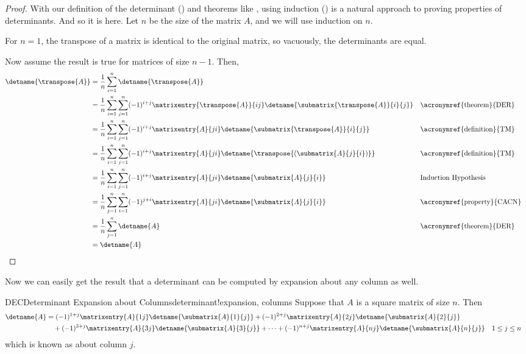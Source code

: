 \begin{proof}
%
With our definition of the determinant () and theorems like , using induction () is a natural approach to proving properties of determinants.  And so it is here.  Let $n$ be the size of the matrix $A$, and we will use induction on $n$.\par
%
For $n=1$, the transpose of a matrix is identical to the original matrix, so vacuously, the determinants are equal.\par
%
Now assume the result is true for matrices of size $n-1$.  Then,
%
\begin{align*}
\detname{\transpose{A}}
&=\frac{1}{n}\sum_{i=1}^{n}\detname{\transpose{A}}\\
%
&=
\frac{1}{n}\sum_{i=1}^{n}\sum_{j=1}^{n}(-1)^{i+j}
\matrixentry{\transpose{A}}{ij}\detname{\submatrix{\transpose{A}}{i}{j}}
&&\text{\acronymref{theorem}{DER}}\\
%
&=
\frac{1}{n}\sum_{i=1}^{n}\sum_{j=1}^{n}(-1)^{i+j}
\matrixentry{A}{ji}\detname{\submatrix{\transpose{A}}{i}{j}}
&&\text{\acronymref{definition}{TM}}\\
%
&=
\frac{1}{n}\sum_{i=1}^{n}\sum_{j=1}^{n}(-1)^{i+j}
\matrixentry{A}{ji}\detname{\transpose{\left(\submatrix{A}{j}{i}\right)}}
&&\text{\acronymref{definition}{TM}}\\
%
&=
\frac{1}{n}\sum_{i=1}^{n}\sum_{j=1}^{n}(-1)^{i+j}
\matrixentry{A}{ji}\detname{\submatrix{A}{j}{i}}
&&\text{Induction Hypothesis}\\
%
&=
\frac{1}{n}\sum_{j=1}^{n}\sum_{i=1}^{n}(-1)^{j+i}
\matrixentry{A}{ji}\detname{\submatrix{A}{j}{i}}
&&\text{\acronymref{property}{CACN}}\\
%
&=
\frac{1}{n}\sum_{j=1}^{n}\detname{A}
&&\text{\acronymref{theorem}{DER}}\\
%
&=\detname{A}
%
\end{align*}
%
\end{proof}
%
Now we can easily get the result that a determinant can be computed by expansion about any column as well.
%
\begin{theorem}{DEC}{Determinant Expansion about Columns}{determinant!expansion, columns}
Suppose that $A$ is a square matrix of size $n$.  Then
%
\begin{align*}
\detname{A}&=
(-1)^{1+j}\matrixentry{A}{1j}\detname{\submatrix{A}{1}{j}}+
(-1)^{2+j}\matrixentry{A}{2j}\detname{\submatrix{A}{2}{j}}\\
&\quad+(-1)^{3+j}\matrixentry{A}{3j}\detname{\submatrix{A}{3}{j}}+
\cdots+
(-1)^{n+j}\matrixentry{A}{nj}\detname{\submatrix{A}{n}{j}}
&&
1\leq j\leq n
%
\end{align*}
%
which is known as  about column $j$.
%
\end{theorem}
